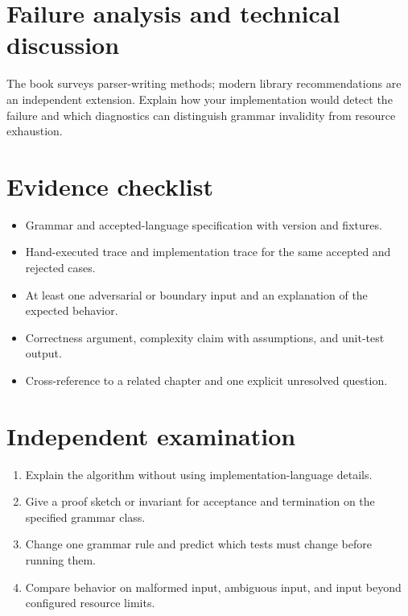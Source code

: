 \documentclass[11pt,letterpaper]{article}
\begin{document}
\section{Failure analysis and technical discussion}
The book surveys parser-writing methods; modern library recommendations are an independent extension. Explain how your implementation would detect the failure and which diagnostics can distinguish grammar invalidity from resource exhaustion.
\section{Evidence checklist}
\begin{itemize}
\item Grammar and accepted-language specification with version and fixtures.
\item Hand-executed trace and implementation trace for the same accepted and rejected cases.
\item At least one adversarial or boundary input and an explanation of the expected behavior.
\item Correctness argument, complexity claim with assumptions, and unit-test output.
\item Cross-reference to a related chapter and one explicit unresolved question.
\end{itemize}
\section{Independent examination}
\begin{enumerate}
\item Explain the algorithm without using implementation-language details.
\item Give a proof sketch or invariant for acceptance and termination on the specified grammar class.
\item Change one grammar rule and predict which tests must change before running them.
\item Compare behavior on malformed input, ambiguous input, and input beyond configured resource limits.
\end{enumerate}
\end{document}
